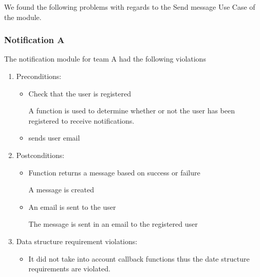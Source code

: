 
 We found the following problems with regards to the Send message Use Case of the module.
 \subsubsection*{Notification A}
 The notification module for team A had the following violations
 \begin{enumerate}
 	\item Preconditions:
 	\begin{itemize}
 		\item Check that the user is registered
			
		A function is used to determine whether or not the user has been registered to receive notifications.
 		
		\item sends user email
 	\end{itemize}
	\item Postconditions:
	\begin{itemize}
		\item Function returns a message based on success or failure
			
		A message is created

		\item An email is sent to the user 
		
		The message is sent in an email to the registered user
 	
	\end{itemize}
	

	\item Data structure requirement violations:
 	\begin{itemize}
 		\item It did not take into account callback functions thus the date structure requirements are violated.
 		
 	\end{itemize}
 \end{enumerate}
